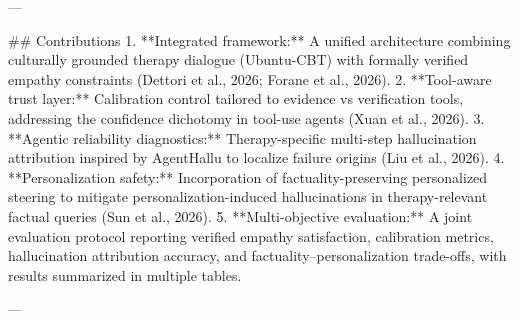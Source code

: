 ---

## Contributions  
1. **Integrated framework:** A unified architecture combining culturally grounded therapy dialogue (Ubuntu-CBT) with formally verified empathy constraints (Dettori et al., 2026; Forane et al., 2026).  
2. **Tool-aware trust layer:** Calibration control tailored to evidence vs verification tools, addressing the confidence dichotomy in tool-use agents (Xuan et al., 2026).  
3. **Agentic reliability diagnostics:** Therapy-specific multi-step hallucination attribution inspired by AgentHallu to localize failure origins (Liu et al., 2026).  
4. **Personalization safety:** Incorporation of factuality-preserving personalized steering to mitigate personalization-induced hallucinations in therapy-relevant factual queries (Sun et al., 2026).  
5. **Multi-objective evaluation:** A joint evaluation protocol reporting verified empathy satisfaction, calibration metrics, hallucination attribution accuracy, and factuality–personalization trade-offs, with results summarized in multiple tables.

---